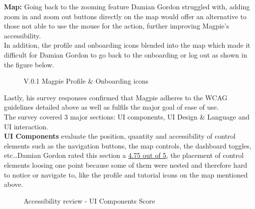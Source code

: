 \newpage
\noindent\textbf{Map: }
Going back to the zooming feature Damian Gordon struggled with, adding zoom in and zoom out buttons directly on the map would offer an alternative to those not able to use the mouse for the action, further improving Magpie's accessibility.\\In addition, the profile and onboarding icons blended into the map which made it difficult for Damian Gordon to go back to the onboarding or log out as shown in the figure below.
\begin{figure}[h!]
    \centering
    \caption{V.0.1 Magpie Profile \& Onboarding icons}
\end{figure}

\newpage
\noindent Lastly, his survey responses confirmed that Magpie adheres to the WCAG guidelines detailed above as well as fulfils the major goal of ease of use.\\
The survey covered 3 major sections: UI components, UI Design \& Language and UI interaction.\\
\textbf{UI Components} evaluate the position, quantity and accessibility of control elements such as the navigation buttons, the map controls, the dashboard toggles, etc\ldots Damian Gordon rated this section a \underline{4.75 out of 5}, the placement of control elements loosing one point because some of them were nested and therefore hard to notice or navigate to, like the profile and tutorial icons on the map mentioned above.
\begin{figure}
    \centering
    \caption{Accessibility review - UI Components Score}
\end{figure}

